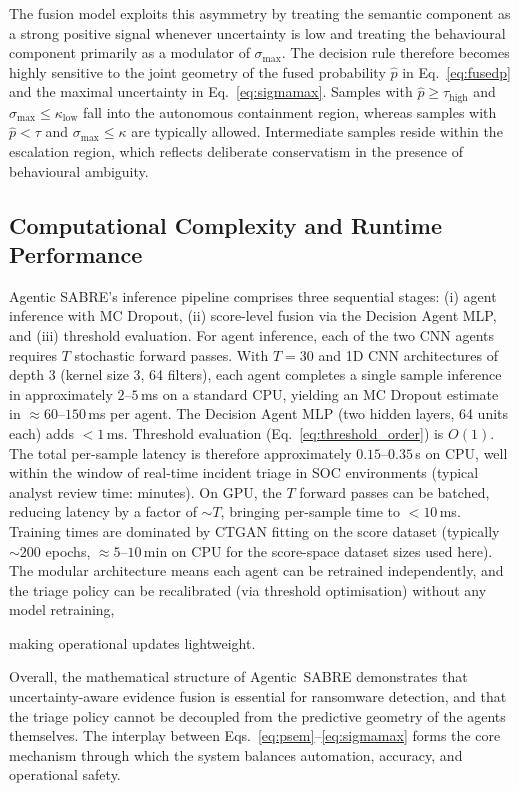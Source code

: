 \documentclass[lettersize,journal]{IEEEtran}
\begin{document}
The fusion model exploits this asymmetry by treating the semantic component as a strong positive signal whenever uncertainty is low and treating the behavioural component primarily as a modulator of \(\sigma_{\max}\). The decision rule therefore becomes highly sensitive to the joint geometry of the fused probability \(\hat{p}\) in Eq.~\eqref{eq:fusedp} and the maximal uncertainty in Eq.~\eqref{eq:sigmamax}. Samples with \(\hat{p} \ge \tau_{\mathrm{high}}\) and \(\sigma_{\max} \le \kappa_{\mathrm{low}}\) fall into the autonomous containment region, whereas samples with \(\hat{p} < \tau\) and \(\sigma_{\max} \le \kappa\) are typically allowed. Intermediate samples reside within the escalation region, which reflects deliberate conservatism in the presence of behavioural ambiguity.


\cbstart
\subsection*{Computational Complexity and Runtime Performance}

Agentic SABRE's inference pipeline
\cbend
 comprises three sequential stages: (i) agent inference
with MC Dropout, (ii) score-level fusion via the Decision Agent MLP, and (iii) threshold
evaluation. For agent inference, each of the two CNN agents requires $T$ stochastic forward
passes. With $T = 30$ and 1D CNN architectures of depth 3 (kernel size 3, 64 filters), each
agent completes a single sample inference in approximately $2$--$5$\,ms on a standard CPU,
yielding an MC Dropout estimate in $\approx 60$--$150$\,ms per agent. The Decision Agent
MLP (two hidden layers, 64 units each) adds $< 1$\,ms. Threshold evaluation
(Eq.~\ref{eq:threshold_order}) is $O(1)$. The total per-sample latency is therefore
approximately $0.15$--$0.35$\,s on CPU, well within the window of real-time incident triage
in SOC environments (typical analyst review time: minutes). On GPU, the $T$ forward passes
can be batched, reducing latency by a factor of $\sim T$, bringing per-sample time to
$<10$\,ms. Training times are dominated by CTGAN fitting on the score dataset (typically
$\sim 200$ epochs, $\approx 5$--$10$\,min on CPU for the score-space dataset sizes used
here). The modular architecture means each agent can be retrained independently, and the
triage policy can be recalibrated (via threshold optimisation) without any model retraining,

\cbstart
making operational updates lightweight.
\cbend


Overall, the mathematical structure of Agentic~SABRE demonstrates that uncertainty-aware evidence fusion is essential for ransomware detection, and that the triage policy cannot be decoupled from the predictive geometry of the agents themselves. The interplay between Eqs.~\eqref{eq:psem}--\eqref{eq:sigmamax} forms the core mechanism through which the system balances automation, accuracy, and operational safety.
\end{document}
